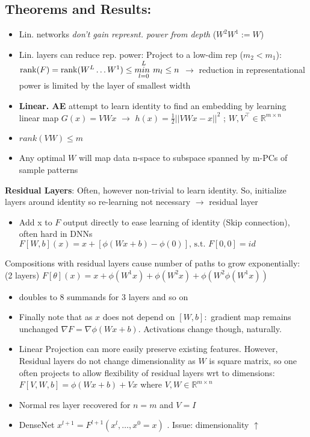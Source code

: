  \subsection{Theorems and Results:}
\begin{itemize}
    \item Lin. networks \textit{don't gain represnt. power from depth} (\(W^2W^1:=W\))
    \item Lin. layers can reduce rep. power: Project to a low-dim rep (\(m_2<m_1\)):\\
    \textrightarrow\(\operatorname{rank}(F)=\operatorname{rank}(W^L\dots W^1) \leq \overset{L}{\underset{l=0}{min\textbf{  }}} m_l \leq n\) \(\rightarrow\) reduction in representational power is limited by the layer of smallest width
    
    \item \textbf{Linear. AE} attempt to learn identity to find an embedding by learning linear map \(G(x) = VWx\) \(\rightarrow\) \(h(x) = \frac{1}{2}||VWx-x||^2\) ; \(W,V^\top \in \mathbb{R}^{m\times n}\)
    \item \(rank(VW)\leq m\)
    \item Any optimal \(W\) will map data n-space to subspace spanned by m-PCs of sample patterns
\end{itemize}  
\textbf{Residual Layers}: Often, however non-trivial to learn identity. So, initialize layers around identity so re-learning not necessary \(\rightarrow\) residual layer
\begin{itemize}
    \item Add x to \(F\) output directly to ease learning of identity (Skip connection), often hard in DNNs \(F[W,b](x)=x+[\phi(Wx+b)-\phi(0)] \text{, s.t. }F[0,0]=id\)
\end{itemize}
Compositions with residual layers cause number of paths to grow exponentially: (2 layers) \(F[\theta](x)= x + \phi(W^1x)+\phi(W^2x)+\phi(W^2\phi(W^1x))\)
\begin{itemize}
    \item doubles to 8 summands for 3 layers and so on
    \item Finally note that as \(x\) does not depend on \([W,b]: \) gradient map remains unchanged \(\nabla F=\nabla \phi(Wx+b)\). Activations change though, naturally.
    \item Linear Projection can more easily preserve existing features. However, Residual layers do not change dimensionality as \(W\) is square matrix, so one often projects to allow flexibility of residual layers wrt to dimensions: \(F[V,W,b]=\phi(Wx+b)+Vx\) where \(V,W \in \mathbb{R}^{m\times n}\)
    \item Normal res layer recovered for \(n=m\) and \(V=I\)
    \item DenseNet \(x^{l+1}= F^{l+1}(x^l,\dots,x^0=x)\) . Issue: dimensionality \(\uparrow\) 
\end{itemize}
